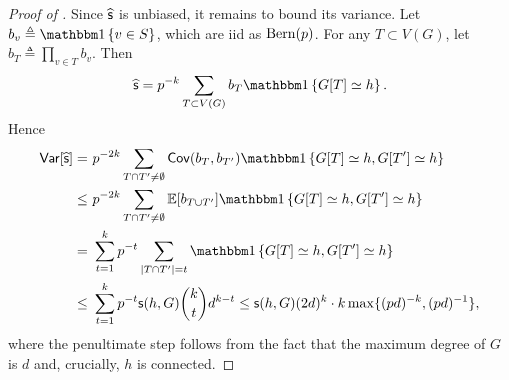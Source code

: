 \begin{proof}[Proof of ]
	Since $\widehat{\mathsf{s}}$ is unbiased, it remains to bound its variance. 
	Let $b_v \triangleq \indc{v\in S}$, which are iid as $\mathrm{Bern}(p)$. For any $T\subset V(G)$, let $b_T \triangleq \prod_{v\in T} b_v$.
	Then 
	\[
	\hat\s = p^{-k} \sum_{T \subset V(G)} b_T \indc{G[T] \simeq h}. 
	\]
	Hence
	\begin{align*}
	\Var[\hat\s]
	= & ~ p^{-2k}\sum_{T \cap T' \neq \emptyset} \Cov(b_T,b_{T'}) \indc{G[T] \simeq h, G[T'] \simeq h}  \\
	\leq & ~ 	p^{-2k} \sum_{T \cap T' \neq \emptyset} \Expect[b_{T\cup T'}] \indc{G[T] \simeq h, G[T'] \simeq h}  \\
	=  & ~ 	\sum_{t=1}^k p^{-t}  \sum_{|T \cap T'|=t} \indc{G[T] \simeq h, G[T'] \simeq h}  \\
	\leq & ~ 	\sum_{t=1}^k p^{-t}  \s(h,G) \binom{k}{t}  d^{k-t} 
			\leq  \s(h,G) (2d)^k \cdot k \max\{(pd)^{-k},(pd)^{-1}\},
	\end{align*}
	where the penultimate step follows from the fact that the maximum degree of $G$ is $d$ and, crucially, $h$ is connected.	
\end{proof}

